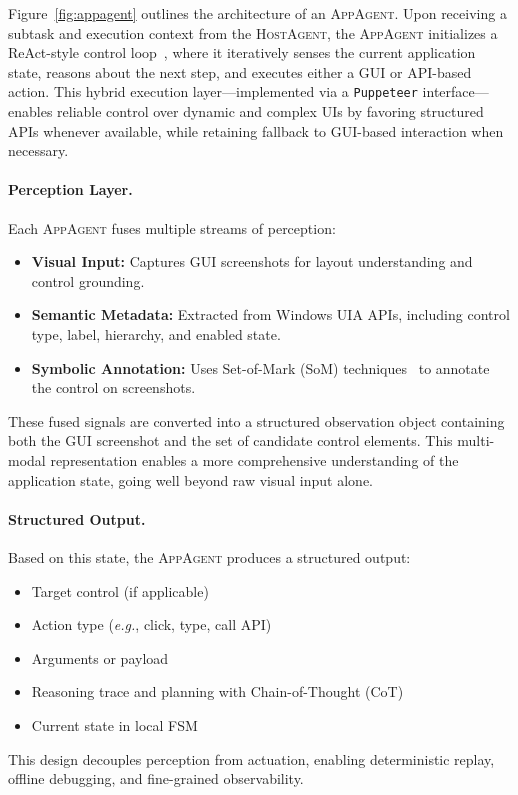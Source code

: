 \documentclass[sigplan,10pt]{acmart}
\newcommand{\hosta}{\textsc{HostAgent}\xspace}
\newcommand{\appa}{\textsc{AppAgent}\xspace}
\newcommand{\eg}{\textit{e.g.},\xspace}
\begin{document}
Figure~\ref{fig:appagent} outlines the architecture of an \appa. Upon receiving a subtask and execution context from the \hosta, the \appa initializes a ReAct-style control loop~\cite{yao2023react}, where it iteratively senses the current application state, reasons about the next step, and executes either a GUI or API-based action. This hybrid execution layer—implemented via a \texttt{Puppeteer} interface—enables reliable control over dynamic and complex UIs by favoring structured APIs whenever available, while retaining fallback to GUI-based interaction when necessary.



\paragraph{Perception Layer.}
Each \appa fuses multiple streams of perception:
\begin{itemize}
    \item \textbf{Visual Input:} Captures GUI screenshots for layout understanding and control grounding.
    \item \textbf{Semantic Metadata:} Extracted from Windows UIA APIs, including control type, label, hierarchy, and enabled state.
    \item \textbf{Symbolic Annotation:} Uses Set-of-Mark (SoM) techniques~\cite{yang2023set} to annotate the control on screenshots.
\end{itemize}
These fused signals are converted into a structured observation object containing both the GUI screenshot and the set of candidate control elements. This multi-modal representation enables a more comprehensive understanding of the application state, going well beyond raw visual input alone.

\paragraph{Structured Output.}
Based on this state, the \appa produces a structured output:
\begin{itemize}
    \item Target control (if applicable)
    \item Action type (\eg click, type, call API)
    \item Arguments or payload
    \item Reasoning trace and planning with Chain-of-Thought (CoT)~\cite{wei2022chain, ding2024everything}
    \item Current state in local FSM
\end{itemize}
This design decouples perception from actuation, enabling deterministic replay, offline debugging, and fine-grained observability.
\end{document}
